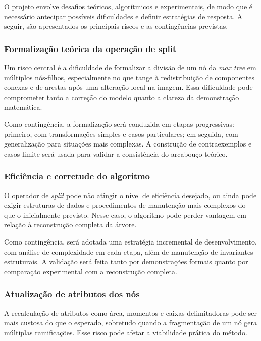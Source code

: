 O projeto envolve desafios teóricos, algorítmicos e 
experimentais, de modo que é necessário antecipar possíveis 
dificuldades e definir estratégias de resposta. 
A seguir, são apresentados os principais riscos e as 
contingências previstas.

\subsubsection{Formalização teórica da operação de split}

Um risco central é a dificuldade de formalizar a divisão 
de um nó da \textit{max tree} em múltiplos nós-filhos, 
especialmente no que tange à redistribuição de 
componentes conexas e de arestas após uma alteração 
local na imagem. Essa dificuldade pode comprometer 
tanto a correção do modelo quanto a clareza da 
demonstração matemática.

Como contingência, a formalização será conduzida em 
etapas progressivas: primeiro, com transformações simples 
e casos particulares; em seguida, com generalização para 
situações mais complexas. A construção de contraexemplos 
e casos limite será usada para validar a consistência 
do arcabouço teórico.

\subsubsection{Eficiência e corretude do algoritmo}

O operador de \textit{split} pode não atingir o nível de 
eficiência desejado, ou ainda pode exigir estruturas de 
dados e procedimentos de manutenção mais complexos do 
que o inicialmente previsto. Nesse caso, o algoritmo 
pode perder vantagem em relação à reconstrução 
completa da árvore.

Como contingência, será adotada uma estratégia 
incremental de desenvolvimento, com análise de 
complexidade em cada etapa, além de manutenção de 
invariantes estruturais. A validação será feita tanto 
por demonstrações formais quanto por comparação 
experimental com a reconstrução completa.

\subsubsection{Atualização de atributos dos nós}

A recalculação de atributos como área, momentos e 
caixas delimitadoras pode ser mais custosa do que o 
esperado, sobretudo quando a fragmentação de um nó 
gera múltiplas ramificações. Esse risco pode afetar a 
viabilidade prática do método.

